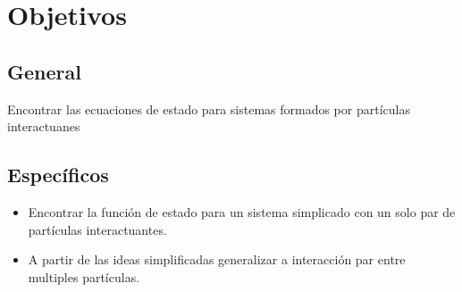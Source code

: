 \section{Objetivos}
\subsection{General}
    Encontrar las ecuaciones de estado para sistemas formados por partículas
    interactuanes

\subsection{Específicos}
    \begin{itemize}
    \item Encontrar la función de estado para un sistema simplicado con 
    un solo par de partículas interactuantes.
    
    \item A partir de las ideas simplificadas generalizar a interacción
    par entre multiples partículas.

    \end{itemize}
    
